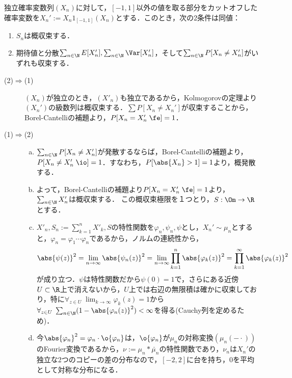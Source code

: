 \documentclass[uplatex,dvipdfmx]{jsreport}
\begin{document}
\begin{theorem}
    独立確率変数列$(X_n)$に対して，$[-1,1]$以外の値を取る部分をカットオフした確率変数を$X_n':=X_n1_{[-1,1]}(X_n)$とする．このとき，次の2条件は同値：
    \begin{enumerate}
        \item $S_n$は概収束する．
        \item 期待値と分散$\sum_{n\in\N}E[X_n'],\sum_{n\in\N}\Var[X_n']$，そして$\sum_{n\in\N}P[X_n\ne X_n']$がいずれも収束する．
    \end{enumerate}
\end{theorem}
\begin{Proof}\mbox{}
    \begin{description}
        \item[(2)$\Rightarrow$(1)] $(X_n)$が独立のとき，$(X'_n)$も独立であるから，Kolmogorovの定理より$(X_n')$の級数列は概収束する．$\sum P[X_n\ne X_n']$が収束することから，Borel-Cantelliの補題より，$P[X_n=X_n'\;\fe]=1$．
        \item[(1)$\Rightarrow$(2)] \begin{enumerate}[(a)]
            \item $\sum_{n\in\N}P[X_n\ne X_n']$が発散するならば，Borel-Cantelliの補題より，$P[X_n\ne X_n'\;\io]=1$．すなわち，$P[\abs{X_n}>1]=1$より，概発散する．
            \item よって，Borel-Cantelliの補題より$P[X_n=X'_n\;\fe]=1$より，$\sum_{n\in\N}X_n'$は概収束する．
            この概収束極限を１つとり，$S:\Om\to\R$とする．
            \item $X'_n,S_n:=\sum_{k=1}^nX'_k,S$の特性関数を$\varphi_n,\psi_n,\psi$とし，$X_n'\sim\mu_n$とすると，$\varphi_n=\varphi_1\cdots\varphi_n$であるから，ノルムの連続性から，
            \[\abs{\psi(z)}^2=\lim_{n\to\infty}\abs{\psi_n(z)}^2=\lim_{n\to\infty}\prod^n_{k=1}\abs{\varphi_k(z)}^2=\prod_{k=1}^\infty\abs{\varphi_k(z)}^2\]
            が成り立つ．$\psi$は特性関数だから$\psi(0)=1$で，さらにある近傍$U\subset\R$上で消えないから，$U$上では右辺の無限積は確かに収束しており，特に$\forall_{z\in U}\;\lim_{k\to\infty}\varphi_k(z)=1$から$\forall_{z\in U}\;\sum_{n\in\N}(1-\abs{\varphi_n(z)}^2)<\infty$を得る(Cauchy列を定めるため)．
            \item 今$\abs{\varphi_n}^2=\varphi_n\cdot\o{\varphi_n}$は，$\o{\varphi_n}$が$\mu_n$の対称変換$(\mu_n(-\cdot))$のFourier変換であるから，$\nu:=\mu_n*\check{\mu_n}$の特性関数であり，$\nu_n$は$X_n'$の独立な2つのコピーの差の分布なので，$[-2,2]$に台を持ち，$0$を平均として対称な分布になる．

\end{enumerate}
\end{description}
\end{Proof}
\end{document}
